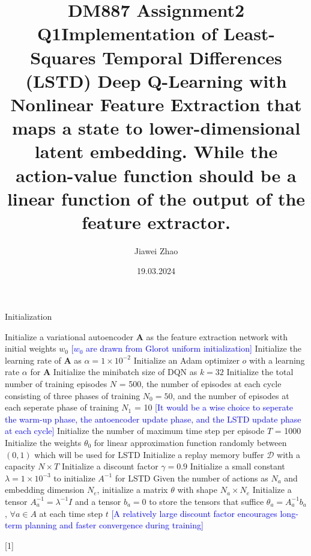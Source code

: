 \documentclass[a4paper,12pt,oneside]{article}
\numberwithin{equation}{section}
\begin{document}
\title{DM887 Assignment2 Q1}
\author{Jiawei Zhao}
\date{19.03.2024}
\maketitle
\title {Implementation of Least-Squares Temporal Differences (LSTD) Deep Q-Learning with Nonlinear Feature Extraction that maps a state to lower-dimensional latent embedding. While the action-value function should be a linear function of the output of the feature extractor.}

\newcommand{\mycomment}[1]{{\fontfamily{lmss}\selectfont\textcolor{blue}{[#1]}}} %
    \begin{algorithm}
        \begin{algorithmic}[1]
        \caption{Initialization}
        \State Initialize a variational autoencoder $\mathbf{A}$ as the feature extraction network with initial weights \(w_0\)
        \mycomment {\(w_0\) are drawn from Glorot uniform initialization}
        \State Initialize the learning rate of $\mathbf{A}$ as $\alpha=1 \times 10^{-2}$ 
        \State Initialize an Adam optimizer \(o\) with a learning rate $\alpha$ for $\mathbf{A}$
        \State Initialize the minibatch size of DQN as \(k=32\) 
        \State Initialize the total number of training episodes \(N\) = 500, the number of episodes at each cycle consisting of three phases of training $N_0=50$, and the number of episodes at each seperate phase of training \(N_1\) = 10 
        \mycomment {It would be a wise choice to seperate the warm-up phase, the antoencoder update phase, and the LSTD update phase at each cycle}
        \State Initialize the number of maximum time step per episode \(T\) = 1000
        \State Initialize the weights $\theta_0$ for linear approximation function randomly between $(0, 1)$ which will be used for LSTD
        \State Initialize a replay memory buffer $\mathcal{D}$ with a capacity \(N \times T\)
        \State Initialize a discount factor $\gamma=0.9$ 
        \State Initialize a small constant $\lambda=1 \times 10^{-3}$ to initialize $A^{-1}$ for LSTD
        \State Given the number of actions as \(N_a\) and embedding dimension \(N_e\), initialize a matrix $\theta$ with shape $N_a \times N_e$
        \State Initialize a tensor $A_a^{-1} = \lambda^{-1}I$ and a tensor $b_a=0$ to store the tensors that suffice $\theta_{a} = A_a^{-1} b_a$, $\forall a \in A$ at each time step $t$
        \mycomment{A relatively large discount factor encourages long-term planning and faster convergence during training}
        \end{algorithmic}[1]
    \end{algorithm}
        
\end{document}
